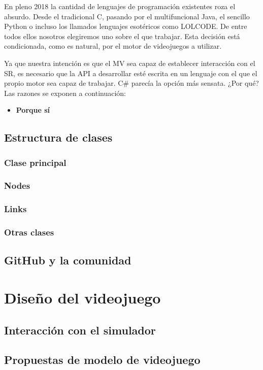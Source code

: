 En pleno 2018 la cantidad de lenguajes de programación existentes roza el absurdo. Desde el tradicional C, pasando por el multifuncional Java, el sencillo Python o incluso los llamados lenguajes esotéricos como LOLCODE\cite{esotericlang}. De entre todos ellos nosotros elegiremos uno sobre el que trabajar. Esta decisión está condicionada, como es natural, por el motor de videojuegos a utilizar.

Ya que nuestra intención es que el MV sea capaz de establecer interacción con el SR, es necesario que la API a desarrollar esté escrita en un lenguaje con el que el propio motor sea capaz de trabajar. C\# parecía la opción más sensata. ¿Por qué? Las razones se exponen a continuación:

\begin{itemize}  
\item \textbf{Porque sí}
\end{itemize}

\subsection{Estructura de clases}
\subsubsection[''GNS3sharp'']{Clase principal}
\subsubsection{Nodes}
\subsubsection{Links}
\subsubsection{Otras clases}
\subsection{GitHub y la comunidad}


\section{Diseño del videojuego}
\subsection{Interacción con el simulador}
\subsection{Propuestas de modelo de videojuego}



